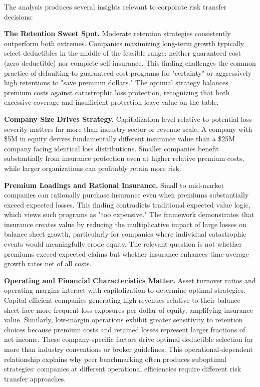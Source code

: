 \documentclass[11pt,letterpaper]{article}
\begin{document}
The analysis produces several insights relevant to corporate risk transfer decisions:

\vspace{\baselineskip}

\textbf{The Retention Sweet Spot.} Moderate retention strategies consistently outperform both extremes. Companies maximizing long-term growth typically select deductibles in the middle of the feasible range: neither guaranteed cost (zero deductible) nor complete self-insurance. This finding challenges the common practice of defaulting to guaranteed cost programs for "certainty" or aggressively high retentions to "save premium dollars." The optimal strategy balances premium costs against catastrophic loss protection, recognizing that both excessive coverage and insufficient protection leave value on the table.

\vspace{\baselineskip}

\textbf{Company Size Drives Strategy.} Capitalization level relative to potential loss severity matters far more than industry sector or revenue scale. A company with \$5M in equity derives fundamentally different insurance value than a \$25M company facing identical loss distributions. Smaller companies benefit substantially from insurance protection even at higher relative premium costs, while larger organizations can profitably retain more risk.

\vspace{\baselineskip}

\textbf{Premium Loadings and Rational Insurance.} Small to mid-market companies can rationally purchase insurance even when premiums substantially exceed expected losses. This finding contradicts traditional expected value logic, which views such programs as "too expensive." The framework demonstrates that insurance creates value by reducing the multiplicative impact of large losses on balance sheet growth, particularly for companies where individual catastrophic events would meaningfully erode equity. The relevant question is not whether premiums exceed expected claims but whether insurance enhances time-average growth rates net of all costs.

\vspace{\baselineskip}

\textbf{Operating and Financial Characteristics Matter.} Asset turnover ratios and operating margins interact with capitalization to determine optimal strategies. Capital-efficient companies generating high revenues relative to their balance sheet face more frequent loss exposures per dollar of equity, amplifying insurance value. Similarly, low-margin operations exhibit greater sensitivity to retention choices because premium costs and retained losses represent larger fractions of net income. These company-specific factors drive optimal deductible selection far more than industry conventions or broker guidelines. This operational-dependent relationship explains why peer benchmarking often produces suboptimal strategies: companies at different operational efficiencies require different risk transfer approaches.
\end{document}

